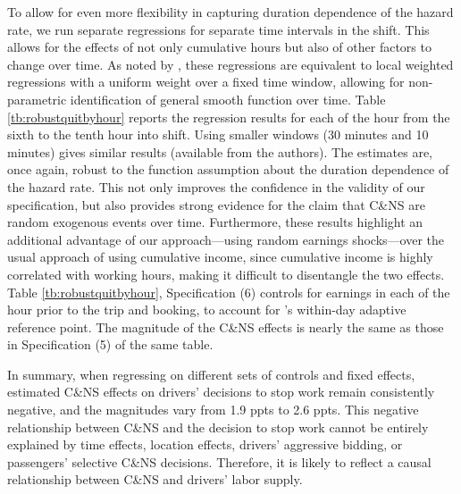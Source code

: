 \documentclass[reviewmode,AEJ]{AEA}
\begin{document}
To allow for even more flexibility in capturing duration dependence of the hazard rate, we run separate 
regressions for separate time intervals in the shift. This allows for the effects of not only cumulative 
hours but also of other factors to change over time. As noted by \cite{thakral2018daily}, these regressions 
are equivalent to local weighted regressions \citep{cleveland1988locally} with a uniform weight over a fixed
time window, allowing for non-parametric identification of general smooth function over time.  
Table \ref{tb:robustquitbyhour} reports the regression results for each of the hour from the sixth to the
tenth hour into shift. Using smaller windows (30 minutes and 10 minutes) gives similar results (available 
from the authors). The estimates are, once again, robust to the function assumption about the duration
dependence of the hazard rate. This not only improves the confidence in the validity of our specification,
but also provides strong evidence for the claim that C\&NS are random exogenous events over time. 
Furthermore, these results highlight an additional advantage of our approach---using random earnings 
shocks---over the usual approach of using cumulative income, since cumulative income is highly correlated
with working hours, making it difficult to disentangle the two effects.  Table \ref{tb:robustquitbyhour}, 
Specification (6) controls for earnings in each of the hour prior to the trip and booking, to account for \cite{thakral2018daily}'s within-day adaptive reference point. The magnitude of the C\&NS effects is nearly 
the same as those in Specification (5) of the same table.


In summary, when regressing on different sets of controls and fixed effects, estimated C\&NS effects on
drivers' decisions to stop work remain consistently negative, and the magnitudes vary
from 1.9 ppts to 2.6 ppts. This negative relationship between C\&NS and the decision to stop work cannot
be entirely explained by time effects, location effects, drivers' aggressive bidding, or passengers' 
selective C\&NS decisions. Therefore, it is likely to reflect a causal relationship between C\&NS and 
drivers' labor supply.
\end{document}
